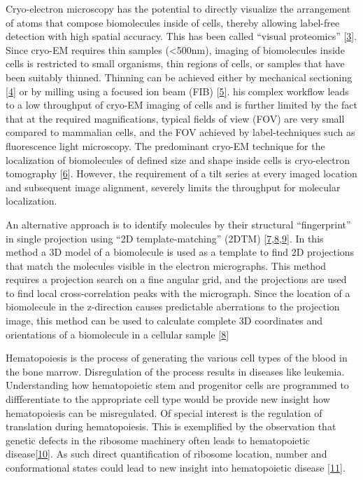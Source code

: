 \documentclass[
]{article}
\begin{document}
Cryo-electron microscopy has the potential to directly visualize the
arrangement of atoms that compose biomolecules inside of cells, thereby
allowing label-free detection with high spatial accuracy. This has been
called ``visual proteomics'' {[}\protect\hyperlink{ref-tGQ6TSUo}{3}{]}. Since cryo-EM
requires thin samples (\textless500nm), imaging of biomolecules inside cells is
restricted to small organisms, thin regions of cells, or samples that
have been suitably thinned. Thinning can be achieved either by
mechanical sectioning {[}\protect\hyperlink{ref-g8QavfwP}{4}{]} or by
milling using a focused ion beam (FIB) {[}\protect\hyperlink{ref-16IhS1Nc4}{5}{]}. his complex workflow
leads to a low throughput of cryo-EM imaging of cells and is further
limited by the fact that at the required magnifications, typical fields
of view (FOV) are very small compared to mammalian cells, and the FOV
achieved by label-techniques such as fluorescence light microscopy. The
predominant cryo-EM technique for the localization of biomolecules of
defined size and shape inside cells is cryo-electron tomography {[}\protect\hyperlink{ref-Rksh2dxu}{6}{]}. However, the requirement of a tilt series at
every imaged location and subsequent image alignment, severely limits
the throughput for molecular localization.

An alternative approach is to identify molecules by their structural
``fingerprint'' in single projection using ``2D template-matching'' (2DTM)
{[}\protect\hyperlink{ref-Ynb3IP6I}{7},\protect\hyperlink{ref-18KGpXYPE}{8},\protect\hyperlink{ref-10bXZuF3G}{9}{]}. In this
method a 3D model of a biomolecule is used as a template to find 2D
projections that match the molecules visible in the electron
micrographs. This method requires a projection search on a fine angular
grid, and the projections are used to find local cross-correlation peaks
with the micrograph. Since the location of a biomolecule in the
z-direction causes predictable aberrations to the projection image, this
method can be used to calculate complete 3D coordinates and orientations
of a biomolecule in a cellular sample
{[}\protect\hyperlink{ref-18KGpXYPE}{8}{]}

Hematopoiesis is the process of generating the various cell types of the blood in
the bone marrow. Disregulation of the process results in diseases like leukemia.
Understanding how hematopoietic stem and progenitor cells are programmed to
diffferentiate to the appropriate cell type would be provide new insight how
hematopoiesis can be misregulated. Of special interest is the regulation of
translation during hematopoiesis. This is exemplified by the observation that
genetic defects in the ribosome machinery often leads to hematopoietic
disease{[}\protect\hyperlink{ref-gRoY21jY}{10}{]}. As such direct quantification of ribosome
location, number and conformational states could lead to new insight into
hematopoietic disease {[}\protect\hyperlink{ref-KAJ7221k}{11}{]}.
\end{document}

